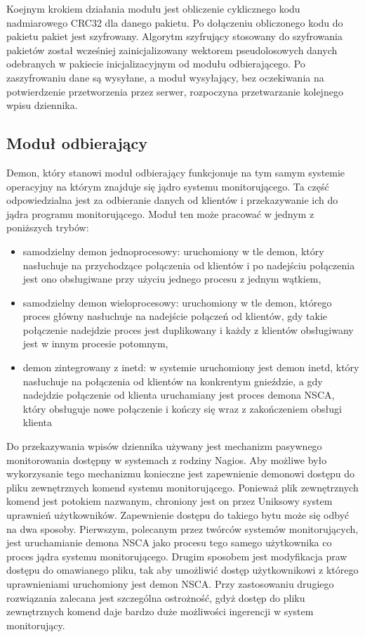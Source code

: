 Koejnym krokiem działania modułu jest obliczenie cyklicznego kodu
nadmiarowego CRC32 dla danego pakietu. Po dołączeniu obliczonego kodu
do pakietu pakiet jest szyfrowany. Algorytm szyfrujący stosowany do
szyfrowania pakietów został wcześniej zainicjalizowany wektorem
pseudolosowych danych odebranych w pakiecie inicjalizacyjnym od modułu
odbierającego. Po zaszyfrowaniu dane są wysyłane, a moduł wysyłający,
bez oczekiwania na potwierdzenie przetworzenia przez serwer,
rozpoczyna przetwarzanie kolejnego wpisu dziennika.

\subsection[Moduł odbierający][Moduł odbierający]{Moduł odbierający}

Demon, który stanowi moduł odbierający funkcjonuje na tym samym
systemie operacyjny na którym znajduje się jądro systemu
monitorującego. Ta część odpowiedzialna jest za odbieranie danych od
klientów i przekazywanie ich do jądra programu monitorującego. Moduł
ten może pracować w jednym z poniższych trybów:

\begin{itemize}
\item samodzielny demon jednoprocesowy: uruchomiony w tle demon, który
  nasłuchuje na przychodzące połączenia od klientów i po nadejściu
  połączenia jest ono obsługiwane przy użyciu jednego procesu z jednym
  wątkiem,
\item samodzielny demon wieloprocesowy: uruchomiony w tle demon,
  którego proces główny nasłuchuje na nadejście połączeń od klientów,
  gdy takie połączenie nadejdzie proces jest duplikowany i każdy z
  klientów obsługiwany jest w innym procesie potomnym,
\item demon zintegrowany z inetd: w systemie uruchomiony jest demon
  inetd, który nasłuchuje na połączenia od klientów na konkrentym
  gnieździe, a gdy nadejdzie połączenie od klienta uruchamiany jest
  proces demona NSCA, który obsługuje nowe połączenie i kończy się
  wraz z zakończeniem obsługi klienta
\end{itemize}

Do przekazywania wpisów dziennika używany jest mechanizm pasywnego
monitorowania dostępny w systemach z rodziny Nagios. Aby możliwe było
wykorzysanie tego mechanizmu konieczne jest zapewnienie demonowi
dostępu do pliku zewnętrznych komend systemu monitorującego. Ponieważ
plik zewnętrznych komend jest potokiem nazwanym, chroniony jest on
przez Uniksowy system uprawnień użytkowników. Zapewnienie dostępu do
takiego bytu może się odbyć na dwa sposoby. Pierwszym, polecanym przez
twórców systemów monitorujących, jest uruchamianie demona NSCA jako
procesu tego samego użytkownika co proces jądra systemu
monitorującego. Drugim sposobem jest modyfikacja praw dostępu do
omawianego pliku, tak aby umożliwić dostęp użytkownikowi z którego
uprawnieniami uruchomiony jest demon NSCA. Przy zastosowaniu drugiego
rozwiązania zalecana jest szczególna ostrożność, gdyż dostęp do pliku
zewnętrznych komend daje bardzo duże możliwości ingerencji w system
monitorujący.

